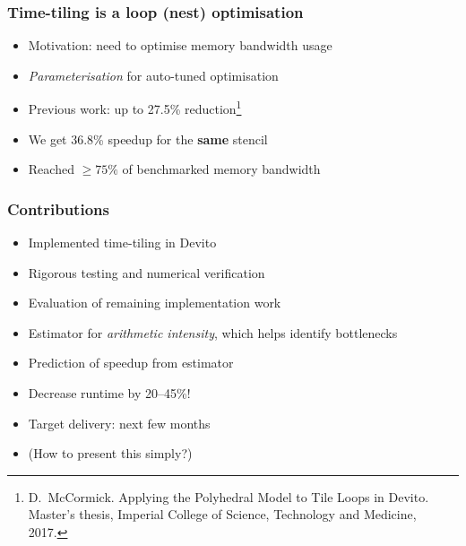 \documentclass{beamer}
\begin{document}
%



\begin{frame}
\frametitle{Time-tiling is a loop (nest) optimisation}

\begin{itemize}
	\item Motivation: need to optimise memory bandwidth usage
	\item \emph{Parameterisation} for auto-tuned optimisation
	\newline
	\item Previous work: up to 27.5\% reduction\footnote{D.~McCormick. Applying the Polyhedral Model to Tile Loops in Devito. Master's thesis, Imperial College of Science, Technology and Medicine, 2017.}
	\item We get 36.8\% speedup for the \textbf{same} stencil
	\item Reached \(\ge 75\%\) of benchmarked memory bandwidth
\end{itemize}
\end{frame}



\begin{frame}
\frametitle{Contributions}

\begin{itemize}
	\item Implemented time-tiling in Devito
	\item Rigorous testing and numerical verification
	\item Evaluation of remaining implementation work
	\item Estimator for \emph{arithmetic intensity}, which helps identify bottlenecks
	\item Prediction of speedup from estimator
	\item Decrease runtime by 20--45\%!
	\newline
	\item Target delivery: next few months
	\item (How to present this simply?)
\end{itemize}
\end{frame}
\end{document}
